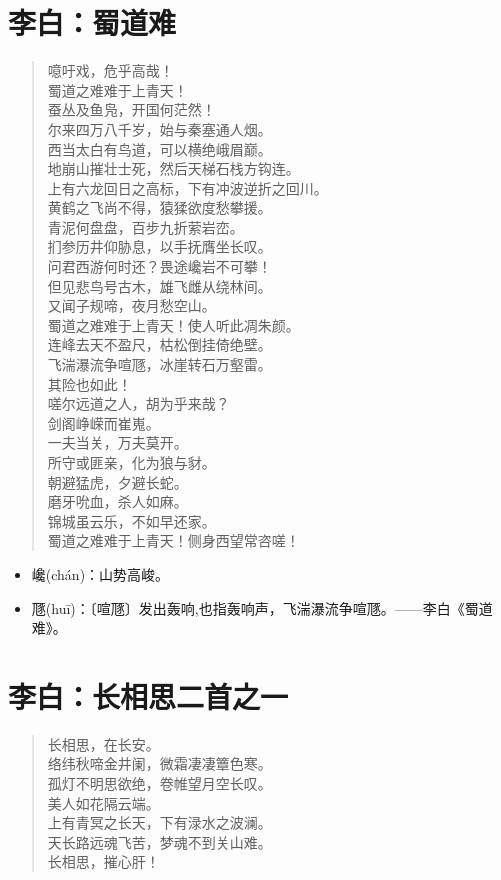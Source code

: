 \documentclass[12pt,oneside]{book}
\newenvironment{shici}{%
\begin{verse}\centering\yanti\large\hspace{12pt}}{\end{verse}}
\begin{document}
\begin{common-format}
\chapter{李白：蜀道难}
\begin{shici}
噫吁戏，危乎高哉！\\
蜀道之难难于上青天！\\
蚕丛及鱼凫，开国何茫然！\\
尔来四万八千岁，始与秦塞通人烟。\\
西当太白有鸟道，可以横绝峨眉巅。\\
地崩山摧壮士死，然后天梯石栈方钩连。\\
上有六龙回日之高标，下有冲波逆折之回川。\\
黄鹤之飞尚不得，猿猱欲度愁攀援。\\
青泥何盘盘，百步九折萦岩峦。\\
扪参历井仰胁息，以手抚膺坐长叹。\\
问君西游何时还？畏途巉岩不可攀！\\
但见悲鸟号古木，雄飞雌从绕林间。\\
又闻子规啼，夜月愁空山。\\
蜀道之难难于上青天！使人听此凋朱颜。\\
连峰去天不盈尺，枯松倒挂倚绝壁。\\
飞湍瀑流争喧豗，冰崖转石万壑雷。\\
其险也如此！\\
嗟尔远道之人，胡为乎来哉？\\
剑阁峥嵘而崔嵬。\\
一夫当关，万夫莫开。\\
所守或匪亲，化为狼与豺。\\
朝避猛虎，夕避长蛇。\\
磨牙吮血，杀人如麻。\\
锦城虽云乐，不如早还家。\\
蜀道之难难于上青天！侧身西望常咨嗟！
\end{shici}

\begin{itemize}
\item 巉(chán)：山势高峻。
\item 豗(huī)：〔喧豗〕发出轰响,也指轰响声，飞湍瀑流争喧豗。——李白《蜀道难》。
\end{itemize}


\chapter{李白：长相思二首之一}
\begin{shici}
长相思，在长安。\\
络纬秋啼金井阑，微霜凄凄簟色寒。\\
孤灯不明思欲绝，卷帷望月空长叹。\\
美人如花隔云端。\\
上有青冥之长天，下有渌水之波澜。\\
天长路远魂飞苦，梦魂不到关山难。\\
长相思，摧心肝！
\end{shici}



\end{common-format}
\end{document}
